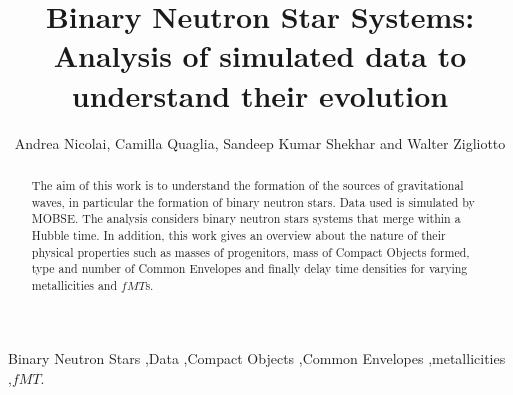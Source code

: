 \documentclass[preprint,12pt]{elsarticle}
\begin{document}
\begin{frontmatter}


\title{Binary Neutron Star Systems: Analysis of simulated data to understand their evolution}




\author{Andrea Nicolai, Camilla Quaglia, Sandeep Kumar Shekhar and Walter Zigliotto}

\address{Department of Physics and Astronomy \\ Università degli Studi di Padova \\via 8 Febbraio 1848, 2, 35122 Padova PD}

\begin{abstract}
The aim of this work is to understand the formation of the sources of gravitational waves, in particular the formation of binary neutron stars. Data used is simulated by MOBSE. The analysis considers binary neutron stars systems that merge within a Hubble time. In addition, this work gives an overview about the nature of their physical properties such as masses of progenitors, mass of Compact Objects formed, type and number of Common Envelopes and finally delay time densities for varying metallicities and $fMT$s.  
\end{abstract}

\begin{keyword}
Binary Neutron Stars \sep Data \sep Compact Objects \sep Common Envelopes \sep metallicities \sep $fMT$.


\end{keyword}

\end{frontmatter}
\end{document}
